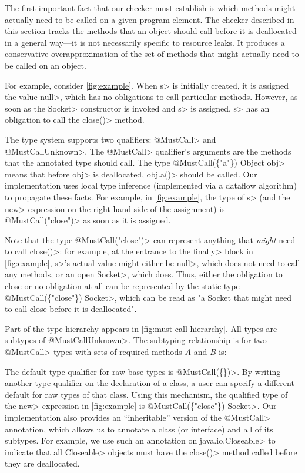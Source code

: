The first important fact that our checker must establish
is which methods might actually need to be called on
a given program element. The checker described in this section
tracks the methods that an object should call before it
is deallocated in a general way---it is not necessarily specific
to resource leaks. It produces a conservative overapproximation of the
set of methods that might actually need to be called on an object.

For example, consider \cref{fig:example}. When \<s> is initially
created, it is assigned the value \<null>, which has no obligations
to call particular methods. However, as soon as the \<Socket> constructor
is invoked and \<s> is assigned, \<s> has an obligation to call the
\<close()> method.

The type system supports two qualifiers: \<@MustCall> and
\<@MustCallUnknown>. The \<@MustCall> qualifier's arguments are the
methods that the annotated type should call. The type
\<@MustCall(\{"a"\}) Object obj> means that before \<obj> is
deallocated, \<obj.a()> should be called. Our implementation
uses local type inference (implemented via a dataflow algorithm)
to propagate these facts. For example, in \cref{fig:example}, the
type of \<s> (and the \<new> expression on the right-hand side of
the assignment) is \<@MustCall("close")> as soon as it is assigned.

Note that the type \<@MustCall("close")>
can represent anything that \emph{might} need to
call \<close()>: for example, at the entrance to
the \<finally> block in \cref{fig:example}, \<s>'s
actual value might either be \<null>, which does not
need to call any methods, or an open \<Socket>, which does.
Thus, either the obligation to close or no obligation at all
can be represented by the static
type \<@MustCall(\{"close"\}) Socket>, which can be read as "a
Socket that might need to call close before it is deallocated".

Part of the type hierarchy appears in \cref{fig:must-call-hierarchy}.
All types are subtypes of \<@MustCallUnknown>.
The subtyping relationship is for two \<@MustCall> types with sets
of required methods $A$ and $B$ is:

The default type qualifier for raw base types is \<@MustCall(\{\})>.
By writing another type qualifier on the declaration of a class, a
user can specify a different default for raw types of that class.
Using this mechanism, the qualified type of the \<new> expression
in \cref{fig:example}
is \<@MustCall(\{"close"\}) Socket>. Our implementation
also provides an ``inheritable'' version of the \<@MustCall> annotation,
which allows us to annotate a class (or interface) and all of its subtypes.
For example, we use such an annotation on \<java.io.Closeable> to indicate
that all \<Closeable> objects must have the \<close()> method called before
they are deallocated.

